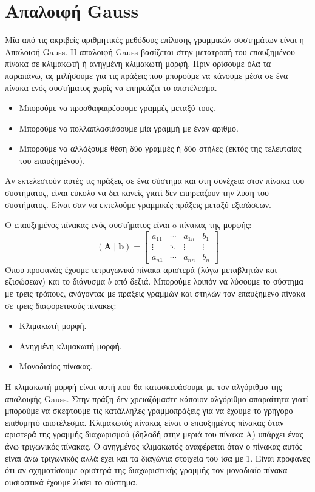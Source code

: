 \chapter{Απαλοιφή {\en Gauss}}
Μία από τις ακριβείς αριθμητικές μεθόδους επίλυσης γραμμικών συστημάτων είναι η Απαλοιφή {\en Gauss}. Η απαλοιφή {\en Gauss} βασίζεται στην μετατροπή του επαυξημένου πίνακα σε κλιμακωτή ή ανηγμένη κλιμακωτή μορφή. Πριν ορίσουμε όλα τα παραπάνω, ας μιλήσουμε για τις πράξεις που μπορούμε να κάνουμε μέσα σε ένα πίνακα ενός συστήματος χωρίς να επηρεάζει το αποτέλεσμα.
\begin{itemize}
\item Μπορούμε να προσθαφαιρέσουμε γραμμές μεταξύ τους.
\item Μπορούμε να πολλαπλασιάσουμε μία γραμμή με έναν αριθμό.
\item Μπορούμε να αλλάξουμε θέση δύο γραμμές ή δύο στήλες (εκτός της τελευταίας του επαυξημένου). 
\end{itemize}
Αν εκτελεστούν αυτές τις πράξεις σε ένα σύστημα και στη συνέχεια στον πίνακα του συστήματος, είναι εύκολο να δει κανείς γιατί δεν επηρεάζουν την λύση του συστήματος. Είναι σαν να εκτελούμε γραμμικές πράξεις μεταξύ εξισώσεων.

Ο επαυξημένος πίνακας ενός συστήματος είναι o πίνακας της μορφής:
\begin{equation}
(\mathbf{A} \mid \mathbf{b})=\left[\begin{array}{lll|l}
a_{11} & \cdots & a_{1n} & b_{1} \\
\vdots & \ddots & \vdots & \vdots \\
a_{n1} & \cdots & a_{nn} & b_{n}
\end{array}\right]
\end{equation}
Όπου προφανώς έχουμε τετραγωνικό πίνακα αριστερά (λόγω μεταβλητών και εξισώσεων) και το διάνυσμα $b$ από δεξιά. Μπορούμε λοιπόν να λύσουμε το σύστημα με τρεις τρόπους, ανάγοντας με πράξεις γραμμών και στηλών τον επαυξημένο πίνακα σε τρεις διαφορετικούς πίνακες:
\begin{itemize}
\item Κλιμακωτή μορφή. 
\item Ανηγμένη κλιμακωτή μορφή.
\item Μοναδιαίος πίνακας.
\end{itemize}
Η κλιμακωτή μορφή είναι αυτή που θα κατασκευάσουμε με τον αλγόριθμο της απαλοιφής {\en Gauss}. Στην πράξη δεν χρειαζόμαστε κάποιον αλγόριθμο απαραίτητα γιατί μπορούμε να σκεφτούμε τις κατάλληλες γραμμοπράξεις για να έχουμε το γρήγορο επιθυμητό αποτέλεσμα. Κλιμακωτός πίνακας είναι ο επαυξημένος πίνακας όταν αριστερά της γραμμής διαχωρισμού (δηλαδή στην μεριά του πίνακα A) υπάρχει ένας άνω τριγωνικός πίνακας. Ο ανηγμένος κλιμακωτός αναφέρεται όταν ο πίνακας αυτός είναι άνω τριγωνικός αλλά έχει και τα διαγώνια στοιχεία του ίσα με 1. Είναι προφανές ότι αν σχηματίσουμε αριστερά της διαχωριστικής γραμμής τον μοναδιαίο πίνακα ουσιαστικά έχουμε λύσει το σύστημα. 

